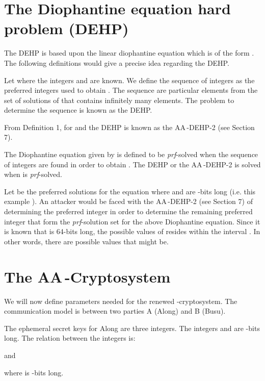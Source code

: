 \documentclass{llncs}
\begin{document}
\section{The Diophantine equation hard problem (DEHP)}
The DEHP is based upon the linear diophantine equation which is of
the form . The following
definitions would give a precise idea regarding the DEHP.

\begin{definition}
Let  where the integers 
and  are known. We define the
sequence of integers  as
the preferred integers used to obtain . The sequence  are particular elements from the
set of solutions of  that
contains infinitely many elements. The problem to determine the
sequence  is known as the
DEHP.
\end{definition}

\begin{definition}
From Definition 1, for  and  the DEHP is
known as the AA\,-DEHP-2 (see Section 7).
\end{definition}

\begin{definition}
The Diophantine equation given by  is defined to be \textit{prf}-solved when the sequence
of integers  are found in
order to obtain . The DEHP or the AA\,-DEHP-2 is
solved when  is \textit{prf}-solved.
\end{definition}

\begin{example}
Let  be the
preferred solutions for the equation
 where  and  are
-bits long (i.e. this example ). An attacker would be
faced with the AA\,-DEHP-2 (see Section 7) of
determining the preferred integer  in order to determine
the remaining preferred integer 
that form the \textit{prf}-solution set for the above Diophantine
equation. Since it is known that  is 64-bits long, the
possible values of  resides within the interval . In other words, there are  possible values
that  might be.
\end{example}

\section{The AA\,-Cryptosystem}
\noindent We will now define parameters needed for the renewed
-cryptosystem. The communication model is between two
parties A (Along) and B (Busu).

\begin{definition}
The ephemeral secret keys for Along are three integers. The
integers  and  are -bits long. The
relation between the integers is:

and

where  is -bits long.
\end{definition}
\end{document}
